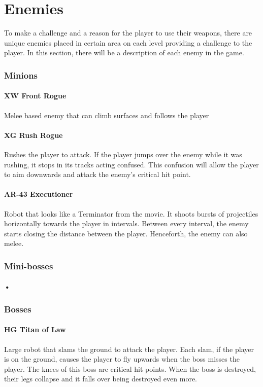 \documentclass[../Main.tex]{subfiles}
\begin{document}
\section{Enemies}

To make a challenge and a reason for the player to use their weapons, there are unique enemies placed in certain area on each level providing a challenge to the player. In this section, there will be a description of each enemy in the game.

\subsubsection{Minions}

\paragraph{XW Front Rogue}

Melee based enemy that can climb surfaces and follows the player

\paragraph{XG Rush Rogue}

Rushes the player to attack. If the player jumps over the enemy while it was rushing, it stops in its tracks acting confused. This confusion will allow the player to aim downwards and attack the enemy's critical hit point.

\paragraph{AR-43 Executioner}

Robot that looks like a Terminator from the movie. It shoots bursts of projectiles horizontally towards the player in intervals. Between every interval, the enemy starts closing the distance between the player. Henceforth, the enemy can also melee. 

\subsubsection{Mini-bosses}

\paragraph{•}

\subsubsection{Bosses}

\paragraph{HG Titan of Law}

Large robot that slams the ground to attack the player. Each slam, if the player is on the ground, causes the player to fly upwards when the boss misses the player. The knees of this boss are critical hit points. When the boss is destroyed, their legs collapse and it falls over being destroyed even more. 
\end{document}
